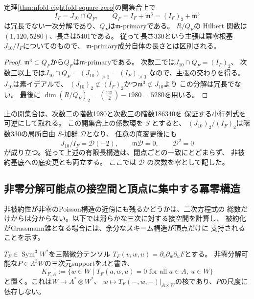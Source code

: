 \begin{corollary}[埋込み点の一次分解]
\label{cor:nfold-vertex-primary}
定理\ref{thm:nfold-eightfold-square-zero}の開集合上で
\[
 I_F=J_{10}\cap Q_F,\qquad
 Q_F=I_F+\mathfrak m^3=(I_F)_2+\mathfrak m^3
\]
は冗長でない一次分解であり、$Q_F$は$\mathfrak m$-primaryである。
$R/Q_F$の Hilbert 関数は$(1,120,5280)$、長さは5401である。
従って長さ330という主張は冪零根基$J_{10}/I_F$についてのもので、
$\mathfrak m$-primary成分自体の長さとは区別される。
\end{corollary}
\begin{proof}
$\mathfrak m^3\subset Q_F$から$Q_F$は$\mathfrak m$-primaryである。
次数二では$J_{10}\cap Q_F=(I_F)_2$、
次数三以上では$J_{10}\cap Q_F=(J_{10})_{\ge3}=(I_F)_{\ge3}$
なので、主張の交わりを得る。
$J_{10}$は素イデアルで、
$(J_{10})_2\not\subset(I_F)_2$かつ$\mathfrak m^3\not\subset J_{10}$より
この分解は冗長でない。
最後に
$\dim(R/Q_F)_2=\binom{121}{2}-1980=5280$を用いる。
\end{proof}

\begin{remark}[相対版]
上の開集合は、次数二の階数1980と次数三の階数186340を
保証する小行列式を可逆にして取れる。
この開集合上の係数環を $S$ とすると、
$(J_{10})_2/(I_F)_2$は階数330の局所自由 $S$-加群 $\mathcal D$となり、
任意の底変更後にも
\[
 J_{10}/I_F=\mathcal D(-2),\qquad
 \mathfrak m\mathcal D=0,\qquad \mathcal D^2=0
\]
が成り立つ。従って上述の有限長構造は、閉点ごとの一致にとどまらず、
非被約基底への底変更とも両立する。
ここでは $\mathcal D$ の次数を零として記した。
\end{remark}


\subsection{非零分解可能点の接空間と頂点に集中する冪零構造}

非被約性が非零のPoisson構造の近傍にも残るかどうかは、二次方程式の
総数だけからは分からない。以下では滑らかな三次に対する接空間を計算し、
被約化がGrassmann錐となる場合には、余分なスキーム構造が頂点だけに
支持されることを示す。

$T_F\in\operatorname{Sym}^3W^*$を三階微分テンソル
$T_F(v,w,u)=\partial_v\partial_w\partial_uF$とする。
非零分解可能な$P\in\Lambda^3W$の三次元supportを$A$と書き、
\begin{equation}\label{eq:nfold-transverse-kernel}
 K_{F,A}:=\{w\in W\mid T_F(a,w,u)=0
                 \text{ for all }a\in A,\ u\in W\}
\end{equation}
と置く。これは$W\to A^*\otimes W^*$、
$w\mapsto T_F(-,w,-)|_{A\times W}$の核であり、$P$の尺度に依存しない。

